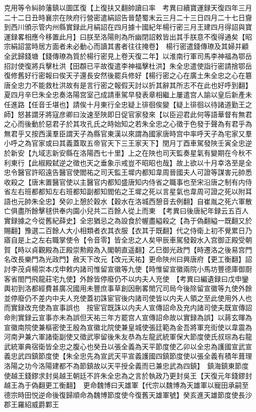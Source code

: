 克用等令糾帥藩鎮以圖匡復【上復扶又翻帥讀曰率　考異曰續寶運録天復四年三月二十二日丑時襄宗在陜府行營密遣絹詔告晉楚蜀末云三月二十三日四月二十七日齎到西川頒示管内州縣實録此月絹詔在四月據十國紀年楊行密三月王建四月得詔與寶運録畧相應今移置此月】曰朕至洛陽則為所幽閉詔敕皆出其手朕意不復得通矣【昭宗絹詔當時居方面者未必動心而讀其書者往往掩卷】　楊行密遣錢傳璙及其婦并顧全武歸錢塘【錢傳璙為質於楊行密見上卷天復二年】以淮南行軍司馬李神福為鄂岳招討使復將兵擊杜洪【田頵已平故復遣李神福擊杜洪】朱全忠遣使詣行密請捨鄂岳復修舊好行密報曰俟天子還長安然後罷兵修好【楊行密之心在廣土朱全忠之心在簒唐全忠力不能救杜洪故有是言行密之報假天討以折其辭其所志不在此也好呼到翻】　夏四月辛巳朱全忠奏洛陽宫室己成請車駕早發表章相繼上屢遣宫人諭以皇后新產未任進路【任音壬堪也】請俟十月東行全忠疑上徘徊俟變【疑上徘徊以待諸道勤王之師】怒甚謂牙將寇彦卿曰汝速至陜即日促官家發來【以臣迎君此何等語華督有無君之心而後動於惡君子於其攻孔氏之時始知之若朱全忠之心徵于色發于聲為有君乎為無君乎又按西漢羣臣謂天子為縣官東漢以來謂為國家唐時宫中率呼天子為宅家又羣小呼之為官家或曰其義蓋取五帝官天下三王家天下】閏月丁酉車駕發陜壬寅全忠逆於新安【九域志新安縣在洛陽西七十里】上之在陜也司天監奏星氣有變期在今秋不利東行【此椒殿弑逆之徵也天之垂象示戒豈不昭昭也哉】故上欲以十月幸洛至是全忠令醫官許昭遠告醫官使閻祐之司天監王墀内都知韋周晉國夫人可證等謀害元帥悉收殺之【唐末置醫官使以主醫官内都知盛唐知内侍省之職事也至宋沿唐之制有内侍省左右班都都知左右班都知副都知閻佑之王墀之死以言星氣也韋周可證之死以附耳語也元帥朱全忠】癸卯上憩於穀水【穀水在洛城西憩音去例翻】自崔胤之死六軍散亡俱盡所餘擊毬供奉内園小兒共二百餘人從上而東　【考異曰後唐紀年録云五百人實録據之今從舊紀薛史】全忠猶忌之為設食於幄盡縊殺之【為于偽翻縊一既翻又於賜翻】豫選二百餘人大小相類者衣其衣服【衣其于既翻】代之侍衛上初不覺累日乃寤自是上之左右職掌使令【令音零】皆全忠之人矣甲辰車駕發穀水入宫御正殿受朝賀【時以貞觀殿為正殿崇勲殿為入閣朝直遥翻】乙巳御光政門【時遷洛之後易宫門名改長樂門為光政門】赦天下改元【改元天祐】更命陜州曰興唐府【更工衡翻】詔討李茂貞楊崇本戊申敕内諸司惟留宣徽等九使【時惟留宣徽兩院小馬坊豐德庫御㕑客省閤門飛龍莊宅九使】外餘皆停廢仍不以内夫人充使　【考異曰編遺録曰戊申鑾輿初到洛都經費甚廣况國用未豐庶事草創因刪畧閒冗司局今後除留宣徽等九使外餘並停廢仍不差内中夫人充使蓋初誅宦官後内諸司使皆以内夫人領之至此使用外人也而實録改充使為宣事誤也　按宦官既誅以内夫人宣傳詔命及充内諸司使夫既宣傳詔命則實録云宣事亦未為誤但天祐三年方罷宫人宣傳詔命故以實録為誤】以蔣玄暉為宣徽南院使兼樞密使王殷為宣徽北院使兼皇城使張廷範為金吾將軍充街使以韋震為河南尹兼六軍諸衛副使又徵武寧留後朱友恭為左龍武統軍保大節度使氏叔琮為右龍武統軍典宿衛皆全忠之腹心也癸丑以張全義為天平節度使乙卯以全忠為護國宣武宣義忠武四鎮節度使【朱全忠先為宣武天平宣義護國四鎮節度使以張全義有積年葺理洛陽之功今洛陽建都不為節鎮故以天平授全義而已兼忠武為四鎮】　鎮海鎮東節度使越王錢鏐求封吳越王朝廷不許朱全忠為之言於執政乃更封吳王【天復元年錢鏐封越王為于偽翻更工衡翻】　更命魏博曰天雄軍【代宗以魏博為天雄軍以寵田承嗣至德宗時田悦逆命後復歸順命為魏博節度使今復舊天雄軍號】癸亥進天雄節度使長沙郡王羅紹威爵鄴王

